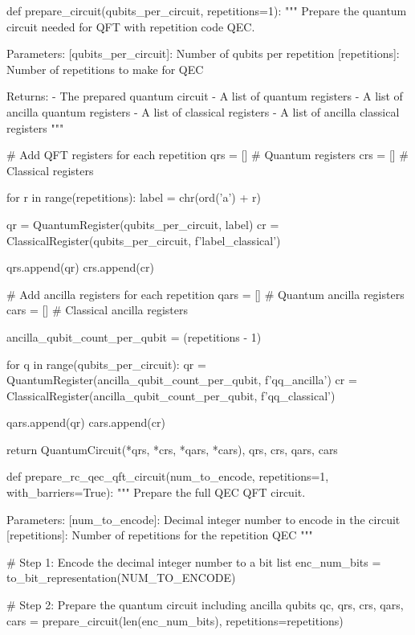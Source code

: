 \begin{python}
def prepare_circuit(qubits_per_circuit, repetitions=1):
    """
    Prepare the quantum circuit needed for QFT with repetition code QEC.

    Parameters:
    [qubits_per_circuit]: Number of qubits per repetition
    [repetitions]: Number of repetitions to make for QEC

    Returns:
    - The prepared quantum circuit
    - A list of quantum registers
    - A list of ancilla quantum registers
    - A list of classical registers
    - A list of ancilla classical registers
    """

    # Add QFT registers for each repetition
    qrs = [] # Quantum registers
    crs = [] # Classical registers

    for r in range(repetitions):
        label = chr(ord('a') + r)

        qr = QuantumRegister(qubits_per_circuit, label)
        cr = ClassicalRegister(qubits_per_circuit, f'{label}_{{classical}}')

        qrs.append(qr)
        crs.append(cr)


    # Add ancilla registers for each repetition
    qars = [] # Quantum ancilla registers
    cars = [] # Classical ancilla registers

    ancilla_qubit_count_per_qubit = (repetitions - 1)

    for q in range(qubits_per_circuit):
        qr = QuantumRegister(ancilla_qubit_count_per_qubit, f'q{q}_{{ancilla}}')
        cr = ClassicalRegister(ancilla_qubit_count_per_qubit, f'q{q}_{{classical}}')

        qars.append(qr)
        cars.append(cr)

    return QuantumCircuit(*qrs, *crs, *qars, *cars), qrs, crs, qars, cars


def prepare_rc_qec_qft_circuit(num_to_encode, repetitions=1, with_barriers=True):
    """
    Prepare the full QEC QFT circuit.

    Parameters:
    [num_to_encode]: Decimal integer number to encode in the circuit
    [repetitions]: Number of repetitions for the repetition QEC
    """

    # Step 1: Encode the decimal integer number to a bit list
    enc_num_bits = to_bit_representation(NUM_TO_ENCODE)

    # Step 2: Prepare the quantum circuit including ancilla qubits
    qc, qrs, crs, qars, cars = prepare_circuit(len(enc_num_bits), repetitions=repetitions)


\end{python}
